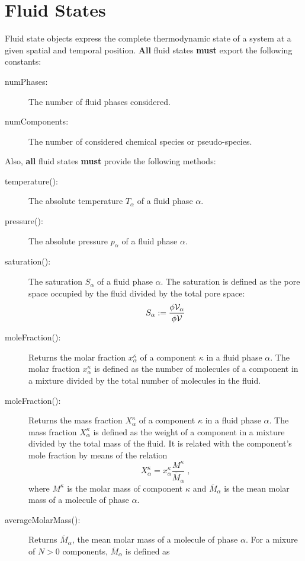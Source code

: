 \section{Fluid States}

Fluid state objects express the complete thermodynamic state of a
system at a given spatial and temporal position. {\bf All} fluid
states {\bf must} export the following constants:
\begin{description}
\item[numPhases:] The number of fluid phases considered.
\item[numComponents:] The number of considered chemical
  species or pseudo-species.
\end{description}

Also, {\bf all} fluid states {\bf must} provide the following methods:
\begin{description}
\item[temperature():] The absolute temperature $T_\alpha$ of
  a fluid phase $\alpha$.
\item[pressure():] The absolute pressure $p_\alpha$ of a
  fluid phase $\alpha$.
\item[saturation():] The saturation $S_\alpha$ of a fluid 
  phase $\alpha$. The saturation is defined as the pore space occupied by the
  fluid divided by the total pore space:
  \[
  S_\alpha := \frac{\phi \mathcal{V}_\alpha}{\phi \mathcal{V}}
  \]
\item[moleFraction():] Returns the molar fraction
  $x^\kappa_\alpha$ of a component $\kappa$ in a fluid phase
  $\alpha$. The molar fraction $x^\kappa_\alpha$ is defined as the number
  of molecules of a component in a mixture divided by the total number
  of molecules in the fluid.
\item[moleFraction():] Returns the mass fraction
  $X^\kappa_\alpha$ of a component $\kappa$ in a fluid phase
  $\alpha$. The mass fraction $X^\kappa_\alpha$ is defined as the
  weight of a component in a mixture divided by the total mass of the
  fluid. It is related with the component's mole fraction by means of
  the relation
  \[
  X^\kappa_\alpha = x^\kappa_\alpha \frac{M^\kappa}{\overline M_\alpha}\;,
  \]
  where $M^\kappa$ is the molar mass of component $\kappa$ and
  $\overline M_\alpha$ is the mean molar mass of a molecule of phase
  $\alpha$.
\item[averageMolarMass():] Returns $\overline M_\alpha$, the
  mean molar mass of a molecule of phase $\alpha$. For a mixure of $N
  > 0$ components, $\overline M_\alpha$ is defined as

\end{description}
